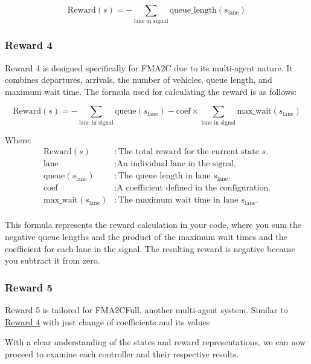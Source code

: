 \begin{equation}
    \text{Reward}(s) = -\sum_{\text{lane in signal}} \text{queue\_length}(s_{\text{lane}})
\end{equation}

\subsubsection{Reward 4} \label{subsec:reward-4}
Reward 4 is designed specifically for FMA2C due to its multi-agent nature. It combines departures, arrivals, the number of vehicles, queue length, and maximum wait time. The formula used for calculating the reward is as follows:

\begin{equation}
    \text{Reward}(s) = -\sum_{\text{lane in signal}} \text{queue}(s_{\text{lane}}) - \text{coef} \times \sum_{\text{lane in signal}} \text{max\_wait}(s_{\text{lane}})
\end{equation}
    
Where:
\begin{align*}
\text{Reward}(s) & : \text{The total reward for the current state } s. \\
\text{lane} & : \text{An individual lane in the signal.} \\
\text{queue}(s_{\text{lane}}) & : \text{The queue length in lane } s_{\text{lane}}. \\
\text{coef} & : \text{A coefficient defined in the configuration.} \\
\text{max\_wait}(s_{\text{lane}}) & : \text{The maximum wait time in lane } s_{\text{lane}}. \\
\end{align*}
    
This formula represents the reward calculation in your code, where you sum the negative queue lengths and the product of the maximum wait times and the coefficient for each lane in the signal. The resulting reward is negative because you subtract it from zero.

    
\subsubsection{Reward 5} \label{subsec:reward-5}
Reward 5 is tailored for FMA2CFull, another multi-agent system. Similar to \hyperref[subsec:reward-4]{Reward 4} with just change of coefficients and its values

With a clear understanding of the states and reward representations, we can now proceed to examine each controller and their respective results.
